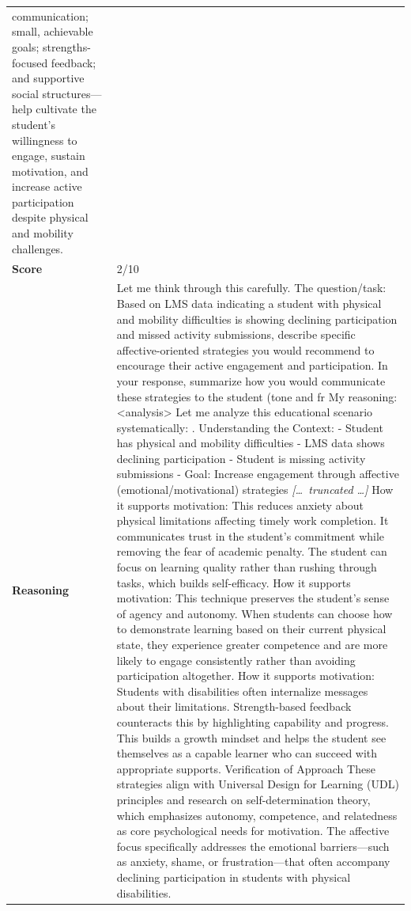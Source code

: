 \begin{longtable}{@{}l p{13cm}@{}}
communication; small, achievable goals; strengths-focused feedback; and supportive social structures---help cultivate the student's willingness to engage, sustain motivation, and increase active participation despite physical and mobility challenges.      \\
  \textbf{Score}     & 2/10  \\
  \textbf{Reasoning} & Let me think through this carefully. \newline The question/task: Based on LMS data indicating a student with physical and mobility difficulties is showing declining participation and missed activity submissions, describe specific affective-oriented strategies you would recommend to encourage their active engagement and participation. In your response, summarize how you would communicate these strategies to the student (tone and fr \newline My reasoning: \textless{}analysis\textgreater{} \newline Let me analyze this educational scenario systematically: \newline 1. Understanding the Context: \newline - Student has physical and mobility difficulties \newline - LMS data shows declining participation \newline - Student is missing activity submissions \newline - Goal: Increase engagement through affective (emotional/motivational) strategies \newline \textit{[\ldots\ truncated \ldots]} \newline How it supports motivation: This reduces anxiety about physical limitations affecting timely work completion. It communicates trust in the student's commitment while removing the fear of academic penalty. The student can focus on learning quality rather than rushing through tasks, which builds self-efficacy. How it supports motivation: This technique preserves the student's sense of agency and autonomy. When students can choose how to demonstrate learning based on their current physical state, they experience greater competence and are more likely to engage consistently rather than avoiding participation altogether. How it supports motivation: Students with disabilities often internalize messages about their limitations. Strength-based feedback counteracts this by highlighting capability and progress. This builds a growth mindset and helps the student see themselves as a capable learner who can succeed with appropriate supports. \newline Verification of Approach \newline These strategies align with Universal Design for Learning (UDL) principles and research on self-determination theory, which emphasizes autonomy, competence, and relatedness as core psychological needs for motivation. The affective focus specifically addresses the emotional barriers---such as anxiety, shame, or frustration---that often accompany declining participation in students with physical disabilities.  \\

\end{longtable}
